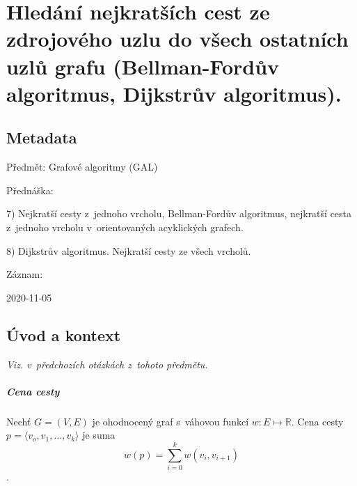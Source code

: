 

\graphicspath{{gal/hledani_nejkratsich_cest}}


\chapter{Hledání nejkratších cest ze zdrojového uzlu do všech ostatních uzlů grafu (Bellman-Fordův algoritmus, Dijkstrův algoritmus).}


\section{Metadata}

\begin{compactitem}
    \item Předmět: Grafové algoritmy (GAL)
    \item Přednáška:
    \begin{compactitem}
        \item 7) Nejkratší cesty z~jednoho vrcholu, Bellman-Fordův algoritmus, nejkratší cesta z~jednoho vrcholu v~orientovaných acyklických grafech.
        \item 8) Dijkstrův algoritmus. Nejkratší cesty ze všech vrcholů.
    \end{compactitem}
    \item Záznam:
    \begin{compactitem}
        \item 2020-11-05
    \end{compactitem}
\end{compactitem}


\section{Úvod a kontext}

\textit{Viz.  v~předchozích otázkách z~tohoto předmětu.}

\paragraph*{Cena cesty} Nechť $G = (V, E)$ je ohodnocený graf s~váhovou funkcí $w: E \mapsto \mathbb{R}$. Cena cesty $p = \langle v_o, v_1, \dots, v_k \rangle$ je suma $$
w(p) = \sum_{i=0}^k w(v_i, v_{i+1})
$$.

